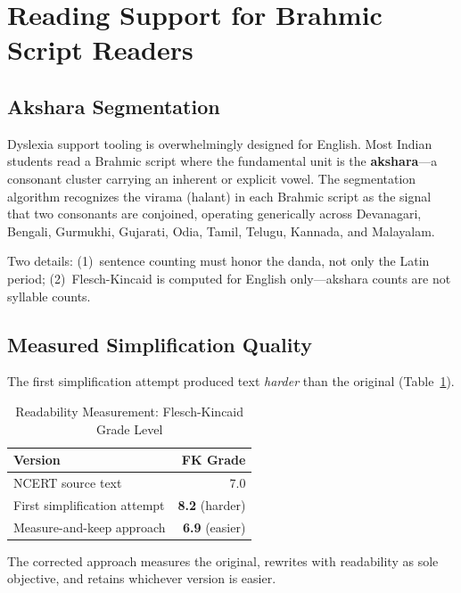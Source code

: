 \documentclass[conference]{IEEEtran}
\begin{document}
\section{Reading Support for Brahmic Script Readers}
\label{sec:accessibility}

\subsection{Akshara Segmentation}
Dyslexia support tooling is overwhelmingly designed for English. Most Indian students read a Brahmic script where the fundamental unit is the \textbf{akshara}---a consonant cluster carrying an inherent or explicit vowel. The segmentation algorithm recognizes the virama (halant) in each Brahmic script as the signal that two consonants are conjoined, operating generically across Devanagari, Bengali, Gurmukhi, Gujarati, Odia, Tamil, Telugu, Kannada, and Malayalam.

Two details: (1)~sentence counting must honor the danda, not only the Latin period; (2)~Flesch-Kincaid is computed for English only---akshara counts are not syllable counts.

\subsection{Measured Simplification Quality}
The first simplification attempt produced text \textit{harder} than the original (Table~\ref{tab:readability}).

\begin{table}[htbp]
\caption{Readability Measurement: Flesch-Kincaid Grade Level}
\label{tab:readability}
\centering
\begin{tabular}{@{}lr@{}}
\toprule
\textbf{Version} & \textbf{FK Grade} \\
\midrule
NCERT source text & 7.0 \\
First simplification attempt & \textbf{8.2} (harder) \\
Measure-and-keep approach & \textbf{6.9} (easier) \\
\bottomrule
\end{tabular}
\end{table}

The corrected approach measures the original, rewrites with readability as sole objective, and retains whichever version is easier.
\end{document}
